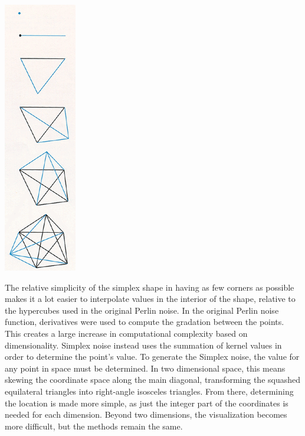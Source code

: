 \documentclass[10pt]{report}
\begin{document}
		\begin{minipage}{\textwidth}
			\centering
			\includegraphics[scale=.75]{six simplexes}
			\label{fig:fig2}
		\end{minipage}
	
		The relative simplicity of the simplex shape in having as few corners as possible makes it a lot easier to interpolate values in the interior of the shape, relative to the hypercubes used in the original Perlin noise.
		In the original Perlin noise function, derivatives were used to compute the gradation between the points. This creates a large increase in computational complexity based on dimensionality. Simplex noise instead uses the summation of kernel values in order to determine the point's value. To generate the Simplex noise, the value for any point in space must be determined. In two dimensional space, this means skewing the coordinate space along the main diagonal, transforming the squashed equilateral triangles into right-angle isosceles triangles. From there, determining the location is made more simple, as just the integer part of the coordinates is needed for each dimension. Beyond two dimensions, the visualization becomes more difficult, but the methods remain the same.  
		
\end{document}
